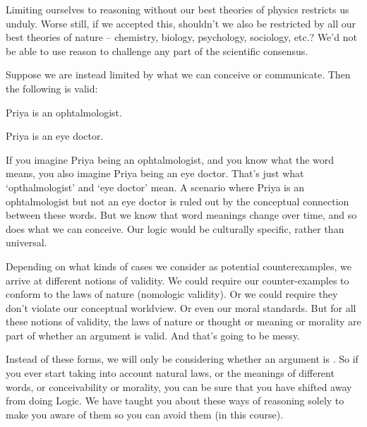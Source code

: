 \documentclass[PHIL101-Textbook.tex]{subfiles}
\begin{document}
Limiting ourselves to reasoning without our best theories of physics restricts us unduly. Worse still, if we accepted this, shouldn't we also be restricted by all our best theories of nature -- chemistry, biology, psychology, sociology, etc.? We'd not be able to use reason to challenge any part of the scientific consensus.


Suppose we are instead limited by what we can conceive or communicate. Then the following is valid:
	\begin{earg}
		\item[] Priya is an ophtalmologist.
		\item[\therefore] Priya is an eye doctor.
	\end{earg}
If you imagine Priya being an ophtalmologist, and you know what the word means, you also imagine Priya being an eye doctor. That's just what `opthalmologist' and `eye doctor' mean. A scenario where Priya is an ophtalmologist but not an eye doctor is ruled out by the conceptual connection between these words. But we know that word meanings change over time, and so does what we can conceive. Our logic would be culturally specific, rather than universal.

Depending on what kinds of cases we consider as potential counterexamples, we arrive at different notions of validity. We could require our counter-examples to conform to the laws of nature (nomologic validity). Or we could require they don't violate our conceptual worldview. Or even our moral standards.  But for all these notions of validity, the laws of nature or thought or meaning or morality are part of whether an argument is valid. And that's going to be messy.

Instead of these forms, we will only be considering whether an argument is . So if you ever start taking into account natural laws, or the meanings of different words, or conceivability or morality, you can be sure that you have shifted away from doing Logic. We have taught you about these ways of reasoning solely to make you aware of them so you can avoid them (in this course).
\end{document}
